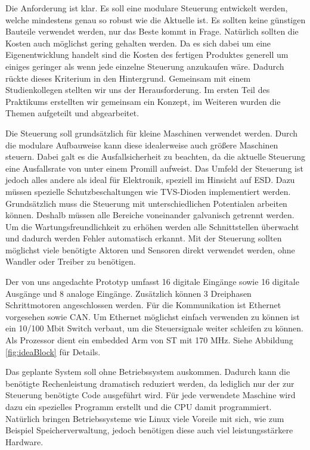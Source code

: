 \documentclass[praktikum,german]{hgbthesis}
\begin{document}
Die Anforderung ist klar. Es soll eine modulare Steuerung entwickelt werden, welche mindestens genau so robust wie die Aktuelle ist. Es sollten keine günstigen Bauteile verwendet werden, nur das Beste kommt in Frage. Natürlich sollten die Kosten auch möglichst gering gehalten werden. Da es sich dabei um eine Eigenentwicklung handelt sind die Kosten des fertigen Produktes generell um einiges geringer als wenn jede einzelne Steuerung anzukaufen wäre. Dadurch rückte dieses Kriterium in den Hintergrund. Gemeinsam mit einem Studienkollegen stellten wir uns der Herausforderung. Im ersten Teil des Praktikums erstellten wir gemeinsam ein Konzept, im Weiteren wurden die Themen aufgeteilt und abgearbeitet. 

Die Steuerung soll grundsätzlich für kleine Maschinen verwendet werden. Durch die modulare Aufbauweise kann diese idealerweise auch größere Maschinen steuern. Dabei galt es die Ausfallsicherheit zu beachten, da die aktuelle Steuerung eine Ausfallsrate von unter einem Promill aufweist. Das Umfeld der Steuerung ist jedoch alles andere als ideal für Elektronik, speziell im Hinsicht auf ESD. Dazu müssen spezielle Schutzbeschaltungen wie TVS-Dioden implementiert werden. Grundsätzlich muss die Steuerung mit unterschiedlichen Potentialen arbeiten können. Deshalb müssen alle Bereiche voneinander galvanisch getrennt werden. Um die Wartungsfreundlichkeit zu erhöhen werden alle Schnittstellen überwacht und dadurch werden Fehler automatisch erkannt. Mit der Steuerung sollten möglichst viele benötigte Aktoren und Sensoren direkt verwendet werden, ohne Wandler oder Treiber zu benötigen.

Der von uns angedachte Prototyp umfasst 16 digitale Eingänge sowie 16 digitale Ausgänge und 8 analoge Eingänge. Zusätzlich können 3 Dreiphasen Schrittmotoren angeschlossen werden. Für die Kommunikation ist Ethernet vorgesehen sowie CAN. Um Ethernet möglichst einfach verwenden zu können ist ein 10/100 Mbit Switch verbaut, um die Steuersignale weiter schleifen zu können. Als Prozessor dient ein embedded Arm von ST mit 170 MHz. Siehe Abbildung \ref{fig:ideaBlock} für Details.

Das geplante System soll ohne Betriebssystem auskommen. Dadurch kann die benötigte Rechenleistung dramatisch reduziert werden, da lediglich nur der zur Steuerung benötigte Code ausgeführt wird. Für jede verwendete Maschine wird dazu ein spezielles Programm erstellt und die CPU damit programmiert. Natürlich bringen Betriebssysteme wie Linux viele Voreile mit sich, wie zum Beispiel Speicherverwaltung, jedoch benötigen diese auch viel leistungsstärkere Hardware. 
\end{document}
